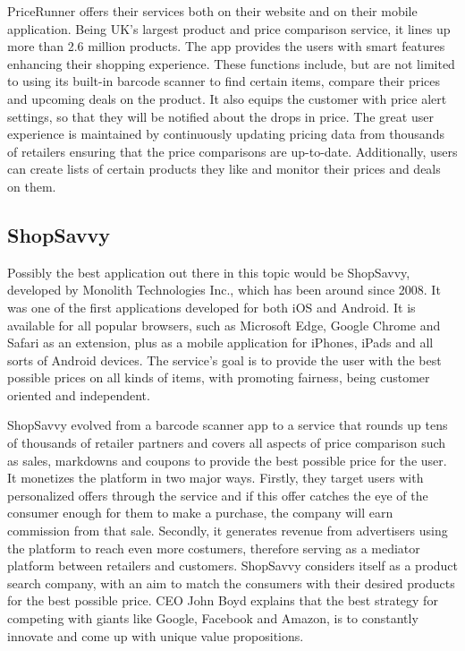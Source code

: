 PriceRunner offers their services both on their website and on their mobile application. Being UK's largest product and price comparison service, it lines up more than 2.6 million products. The app provides the users with smart features enhancing their shopping experience. These functions include, but are not limited to using its built-in barcode scanner to find certain items, compare their prices and upcoming deals on the product. It also equips the customer with price alert settings, so that they will be notified about the drops in price. The great user experience is maintained by continuously updating pricing data from thousands of retailers ensuring that the price comparisons are up-to-date. Additionally, users can create lists of certain products they like and monitor their prices and deals on them. \cite{PriceRunnerApp2023}

\subsection{ShopSavvy}

Possibly the best application out there in this topic would be ShopSavvy, developed by Monolith Technologies Inc., which has been around since 2008. It was one of the first applications developed for both iOS and Android. It is available for all popular browsers, such as Microsoft Edge, Google Chrome and Safari as an extension, plus as a mobile application for iPhones, iPads and all sorts of Android devices. The service's goal is to provide the user with the best possible prices on all kinds of items, with promoting fairness, being customer oriented and independent. \cite{ShopSavvyAbout}

ShopSavvy evolved from a barcode scanner app to a service that rounds up tens of thousands of retailer partners and covers all aspects of price comparison such as sales, markdowns and coupons to provide the best possible price for the user. It monetizes the platform in two major ways. Firstly, they target users with personalized offers through the service and if this offer catches the eye of the consumer enough for them to make a purchase, the company will earn commission from that sale. Secondly, it generates revenue from advertisers using the platform to reach even more costumers, therefore serving as a mediator platform between retailers and customers. ShopSavvy considers itself as a product search company, with an aim to match the consumers with their desired products for the best possible price. CEO John Boyd explains that the best strategy for competing with giants like Google, Facebook and Amazon, is to constantly innovate and come up with unique value propositions. \cite{PymntsShopSavvy}

